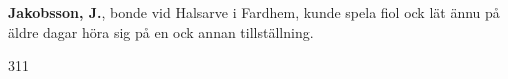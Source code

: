 \textbf{Jakobsson, J.}, bonde vid Halsarve i Fardhem, kunde spela fiol ock lät ännu på äldre dagar höra sig på
en ock annan tillställning.

311 
